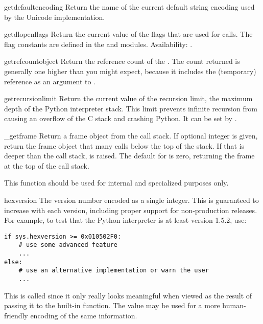 \begin{funcdesc}{getdefaultencoding}{}
  Return the name of the current default string encoding used by the
  Unicode implementation.
\end{funcdesc}

\begin{funcdesc}{getdlopenflags}{}
  Return the current value of the flags that are used for
   calls. The flag constants are defined in the
   and  modules.
  Availability: \UNIX.
\end{funcdesc}

\begin{funcdesc}{getrefcount}{object}
  Return the reference count of the .  The count returned
  is generally one higher than you might expect, because it includes
  the (temporary) reference as an argument to
  .
\end{funcdesc}

\begin{funcdesc}{getrecursionlimit}{}
  Return the current value of the recursion limit, the maximum depth
  of the Python interpreter stack.  This limit prevents infinite
  recursion from causing an overflow of the C stack and crashing
  Python.  It can be set by .
\end{funcdesc}

\begin{funcdesc}{_getframe}{}
  Return a frame object from the call stack.  If optional integer
   is given, return the frame object that many calls below
  the top of the stack.  If that is deeper than the call stack,
   is raised.  The default for  is
  zero, returning the frame at the top of the call stack.

  This function should be used for internal and specialized purposes
  only.
\end{funcdesc}

\begin{datadesc}{hexversion}
  The version number encoded as a single integer.  This is guaranteed
  to increase with each version, including proper support for
  non-production releases.  For example, to test that the Python
  interpreter is at least version 1.5.2, use:

\begin{verbatim}
if sys.hexversion >= 0x010502F0:
    # use some advanced feature
    ...
else:
    # use an alternative implementation or warn the user
    ...
\end{verbatim}

  This is called  since it only really looks
  meaningful when viewed as the result of passing it to the built-in
   function.  The  value may be
  used for a more human-friendly encoding of the same information.
\end{datadesc}

